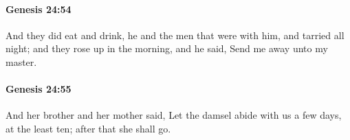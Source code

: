 		\paragraph{Genesis 24:54} %
			\label{GENESIS-24-54}

			And they did eat and drink, he and the men that were with him, and tarried all night; and they rose up in the morning, and he said, Send me away unto my master.


		\paragraph{Genesis 24:55} %
			\label{GENESIS-24-55}

			And her brother and her mother said, Let the damsel abide with us a few days, at the least ten; after that she shall go.


